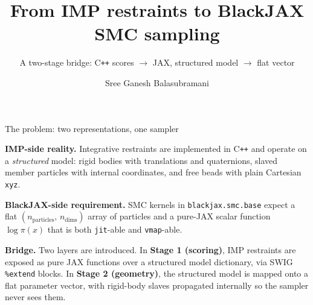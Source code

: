 \documentclass[10pt,aspectratio=169]{beamer}
\title{From IMP restraints to BlackJAX SMC sampling}
\subtitle{A two-stage bridge: C\texttt{++} scores \(\to\) JAX, structured model \(\to\) flat vector}
\author{Sree Ganesh Balasubramani}
\institute{Echeverria \& \v{S}ali groups, QBI, UCSF}
\date{}
\begin{document}
\maketitle

\begin{frame}{The problem: two representations, one sampler}

\textbf{IMP-side reality.}
Integrative restraints are implemented in C\texttt{++} and operate on a
\emph{structured} model: rigid bodies with translations and quaternions,
slaved member particles with internal coordinates, and free beads with
plain Cartesian \texttt{xyz}.

\medskip
\textbf{BlackJAX-side requirement.}
SMC kernels in
\texttt{blackjax.smc.base} expect a flat \((n_\text{particles},\, n_\text{dims})\)
array of particles and a pure-JAX scalar function
\(\log\pi(x)\) that is both \texttt{jit}-able and \texttt{vmap}-able.

\medskip
\textbf{Bridge.}
Two layers are introduced. In \textbf{Stage 1 (scoring)}, IMP restraints are
exposed as pure JAX functions over a structured model dictionary, via SWIG
\texttt{\%extend} blocks. In \textbf{Stage 2 (geometry)}, the structured
model is mapped onto a flat parameter vector, with rigid-body slaves
propagated internally so the sampler never sees them.

\begin{center}
\end{center}

\end{frame}
\end{document}
